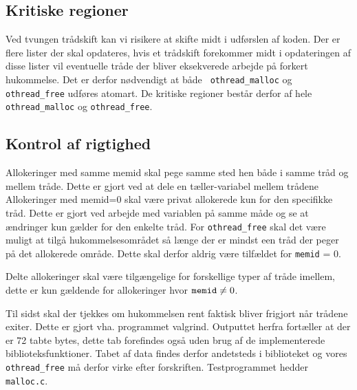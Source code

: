 \documentclass[titlepage]{article}
\begin{document}
\subsection{Kritiske regioner}
Ved tvungen trådskift kan vi risikere at skifte midt i udførslen af koden. Der er flere lister der
skal opdateres, hvis et trådskift forekommer midt i opdateringen af disse lister vil eventuelle
tråde der bliver eksekverede arbejde på forkert hukommelse. Det er derfor nødvendigt at både {\tt
othread\_malloc} og {\tt othread\_free} udføres atomart. De kritiske regioner består derfor af hele
{\tt othread\_malloc} og {\tt othread\_free}.

\subsection{Kontrol af rigtighed}
Allokeringer med samme memid skal pege samme sted hen både i samme tråd og mellem tråde. Dette er
gjort ved at dele en tæller-variabel mellem trådene
Allokeringer med memid=0 skal være privat allokerede kun for den specifikke tråd. Dette er gjort ved
arbejde med variablen på samme måde og se at ændringer kun gælder for den enkelte tråd.
For {\tt othread\_free} skal det være muligt at tilgå hukommelsesområdet så længe der er mindst een
tråd der peger på det allokerede område. Dette skal derfor aldrig være tilfældet for {\tt memid} =
0. 

Delte allokeringer skal være tilgængelige for forskellige typer af tråde imellem, dette er kun
gældende for allokeringer hvor ${\tt memid} \neq 0$.

Til sidst skal der tjekkes om hukommelsen rent faktisk bliver frigjort når trådene exiter. Dette er
gjort vha. programmet valgrind. Outputtet herfra fortæller at der er 72 tabte bytes, dette tab
forefindes også uden brug af de implementerede biblioteksfunktioner. Tabet af data findes derfor
andetsteds i biblioteket og vores {\tt othread\_free} må derfor virke efter forskriften.
Testprogrammet hedder {\tt malloc.c}.
\end{document}
